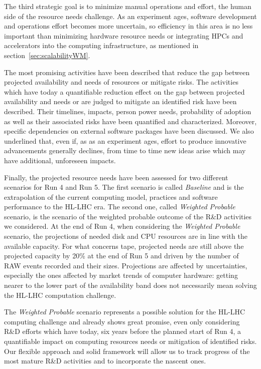 \documentclass{cmspaper}
\begin{document}
The third strategic goal is to minimize manual operations and effort, the human side of the resource needs challenge. As an experiment ages, software development and operations effort becomes more uncertain, so efficiency in this area is no less important than minimizing hardware resource needs or integrating HPCs and accelerators into the computing infrastructure, as mentioned in section~\ref{sec:scalabilityWM}.

The most promising activities have been described that reduce the gap between projected availability and needs of resources or mitigate risks. The activities which have today a quantifiable reduction effect on the gap between projected availability and needs or are judged to mitigate an identified risk have been described. Their timelines, impacts, person power needs, probability of adoption as well as their associated risks have been quantified and characterized. Moreover, specific dependencies on external software packages have been discussed. We also underlined that, even if, as as an experiment ages, effort to produce innovative advancements generally declines, from time to time new ideas arise which may have additional, unforeseen impacts.

Finally, the projected resource needs have been assessed for two different scenarios for Run 4 and Run 5. The first scenario is called \textit{Baseline} and is the extrapolation of the current computing model, practices and software performance to the HL-LHC era. The second one, called \textit{Weighted Probable} scenario, is the scenario of the weighted probable outcome of the R\&D activities we considered.
At the end of Run 4, when considering the \textit{Weighted Probable} scenario, the projections of needed disk and CPU resources are in line with the available capacity. For what concerns tape, projected needs are still above the projected capacity by 20\% at the end of Run 5 and driven by the number of RAW events recorded and their sizes. Projections are affected by uncertainties, especially the ones affected by market trends of computer hardware: getting nearer to the lower part of the availability band does not necessarily mean solving the HL-LHC computation challenge. 

The \textit{Weighted Probable} scenario represents a possible solution for the HL-LHC computing challenge and already shows great promise, even only considering R\&D efforts which have today, six years before the planned start of Run 4, a quantifiable impact on computing resources needs or mitigation of identified risks. Our flexible approach and solid framework will allow us to track progress of the most mature R\&D activities and to incorporate the nascent ones. 
\end{document}
